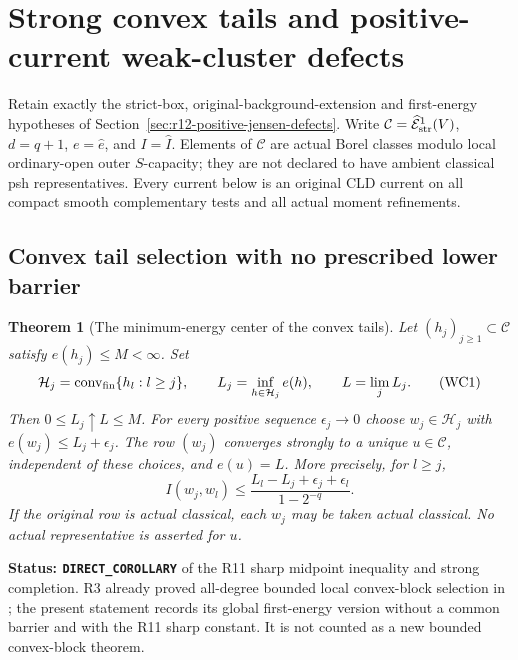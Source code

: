 \documentclass[11pt,a4paper]{article}
\numberwithin{equation}{section}
\newtheorem{theorem}{Theorem}[section]
\theoremstyle{definition}
\theoremstyle{remark}
\begin{document}


\section{Strong convex tails and positive-current weak-cluster defects}
\label{sec:r12-weak-cluster-defects}

Retain exactly the strict-box, original-background-extension and
first-energy hypotheses of Section~\ref{sec:r12-positive-jensen-defects}.
Write $\mathcal C=\widehat{\mathcal E}^1_{\rm str}(V)$,
$d=q+1$, $e=\widehat e$, and $I=\widehat I$.  Elements of
$\mathcal C$ are actual Borel classes modulo local ordinary-open
outer $S$-capacity; they are not declared to have ambient classical
psh representatives.  Every current below is an original CLD
current on all compact smooth complementary tests and all actual
moment refinements.

\subsection{Convex tail selection with no prescribed lower barrier}

\begin{theorem}[The minimum-energy center of the convex tails]
\label{thm:r12-strong-convex-tails}
Let $(h_j)_{j\geq1}\subset\mathcal C$ satisfy $e(h_j)\leq M<\infty$.
Set
\[
 \mathcal H_j=\operatorname{conv}_{\rm fin}\{h_l:l\geq j\},\qquad
 L_j=\inf_{h\in\mathcal H_j}e(h),\qquad L=\lim_j L_j.
 \tag{WC1}
\]
Then $0\leq L_j\uparrow L\leq M$.  For every positive sequence
$\epsilon_j\to0$ choose $w_j\in\mathcal H_j$ with
$e(w_j)\leq L_j+\epsilon_j$.  The row $(w_j)$ converges strongly
to a unique $u\in\mathcal C$, independent of these choices, and
$e(u)=L$.  More precisely, for $l\geq j$,
\[
 I(w_j,w_l)\leq
       \frac{L_l-L_j+\epsilon_j+\epsilon_l}{1-2^{-q}}.
 \tag{WC2}
\]
If the original row is actual classical, each $w_j$ may be taken
actual classical.  No actual representative is asserted for $u$.
\end{theorem}

\noindent\textbf{Status: \texttt{DIRECT\_COROLLARY}} of the R11
sharp midpoint inequality and strong completion.  R3 already proved
all-degree bounded local convex-block selection in
; the present statement records
its global first-energy version without a common barrier and with
the R11 sharp constant.  It is not counted as a new bounded
convex-block theorem.
\end{document}
